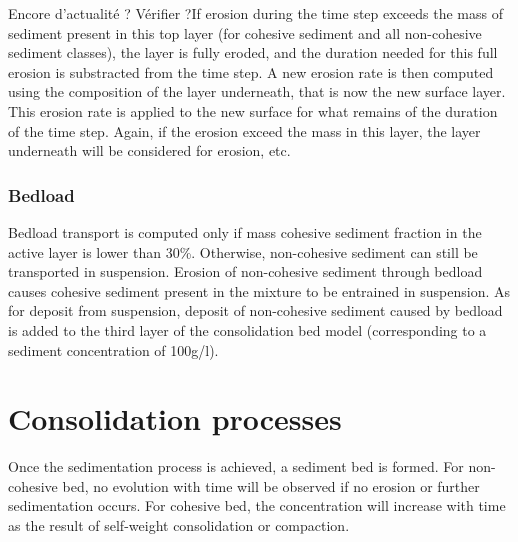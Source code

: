 Encore d’actualité ? Vérifier ?If erosion during the time step exceeds the mass of sediment  present in this top layer (for cohesive sediment and all non-cohesive sediment classes), the layer is fully eroded, and the duration needed for this full erosion is substracted from the time step. A new erosion rate is then computed using the composition of the layer underneath, that is now the new surface layer. This erosion rate is applied to the new surface for what remains of the duration of the time step. Again, if the erosion exceed the mass in this layer, the layer underneath will be considered for erosion, etc.

\subsubsection{Bedload}
Bedload transport is computed only if mass cohesive sediment fraction in the active layer is lower than 30\%. Otherwise, non-cohesive sediment can still be transported in suspension. Erosion of non-cohesive sediment through bedload causes cohesive sediment present in the mixture to be entrained in suspension. As for deposit from suspension, deposit of non-cohesive sediment caused by bedload is added to the third layer of the consolidation bed model (corresponding to a sediment concentration of 100g/l).


\section{Consolidation processes}
Once the sedimentation process is achieved, a sediment bed is formed. For
non-cohesive bed, no evolution with time will be observed if no erosion or
further sedimentation occurs. For cohesive bed, the concentration will
increase with time as the result of self-weight consolidation or compaction.



